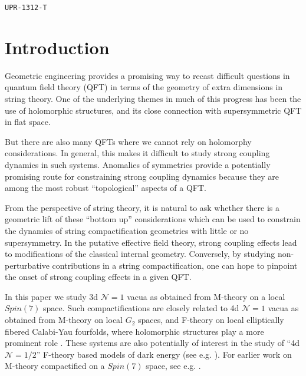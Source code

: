 \documentclass[12pt]{article}%
\numberwithin{equation}{section}
\renewcommand{\(}{\left(}
\renewcommand{\)}{\right)}
\renewcommand{\[}{\left[}
\renewcommand{\]}{\right]}
\begin{document}
{\small \texttt{\hfill UPR-1312-T}}

\maketitle

\setcounter{tocdepth}{2}

\tableofcontents






\newpage

\section{Introduction \label{sec:INTRO}}

Geometric engineering provides a promising way to recast
difficult questions in quantum field theory (QFT) in terms
of the geometry of extra dimensions in string theory.
One of the underlying themes in much of this progress has been the use of
holomorphic structures, and its close connection with supersymmetric QFT
in flat space.

But there are also many QFTs where we cannot rely on holomorphy considerations.
In general, this makes it difficult to study strong coupling
dynamics in such systems. Anomalies of symmetries provide a potentially promising
route for constraining strong coupling dynamics because they are among
the most robust ``topological'' aspects of a QFT.

From the perspective of string theory, it is natural to ask whether there is a geometric lift of these
``bottom up'' considerations which can be used to constrain the dynamics of string compactification geometries
with little or no supersymmetry. In the putative effective field theory, strong coupling effects
lead to modifications of the classical internal geometry. Conversely, by studying non-perturbative contributions
in a string compactification, one can hope to pinpoint the onset of strong coupling effects in a given QFT.

In this paper we study 3d $\mathcal{N} = 1$ vacua as obtained from
M-theory on a local $Spin(7)$ space. Such compactifications are closely
related to 4d $\mathcal{N} = 1$ vacua as obtained from M-theory on local $G_2$ spaces,
and F-theory on local elliptically fibered Calabi-Yau fourfolds,
where holomorphic structures play a more prominent role
\cite{Braun:2018joh, Cvetic:2020piw}. These systems are also potentially
of interest in the study of ``4d $\mathcal{N} = 1/2$'' F-theory based models of dark energy
(see e.g. \cite{Witten:1994cga, Vafa:1996xn, Heckman:2018mxl, Heckman:2019dsj}). For earlier
work on M-theory compactified on a $Spin(7)$ space, see e.g. \cite{Becker:2000jc, Cvetic:2001pga,
Cvetic:2001zx, Cvetic:2001ye, Cvetic:2001sr, Gukov:2001hf, Gukov:2002es, Gukov:2002zg}.
\end{document}
